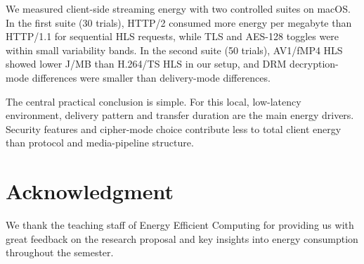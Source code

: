 \documentclass[conference]{IEEEtran}
\begin{document}
We measured client-side streaming energy with two controlled suites on macOS. In the first
suite (30 trials), HTTP/2 consumed more energy per megabyte than HTTP/1.1 for sequential
HLS requests, while TLS and AES-128 toggles were within small variability bands. In the
second suite (50 trials), AV1/fMP4 HLS showed lower J/MB than H.264/TS HLS in our setup,
and DRM decryption-mode differences were smaller than delivery-mode differences.

The central practical conclusion is simple. For this local, low-latency environment,
delivery pattern and transfer duration are the main energy drivers. Security features and
cipher-mode choice contribute less to total client energy than protocol and media-pipeline
structure.


\section*{Acknowledgment}

We thank the teaching staff of Energy Efficient Computing for providing us with
great feedback on the research proposal and key insights into energy consumption
throughout the semester.
\end{document}

